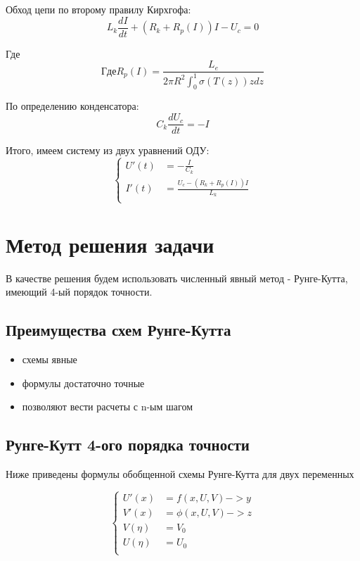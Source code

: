 \documentclass[a4paper,12pt]{article}
\begin{document}
Обход цепи по второму правилу Кирхгофа:
\[L_k \frac{dI}{dt} + (R_k + R_p(I)) I - U_c = 0\]

Где
\[Где R_p(I) = \frac{L_e}{2\pi R^2 \int_{0}^{1} \sigma(T(z)) zdz}\]



По определению конденсатора:
\[C_k \frac{dU_c}{dt} = -I\]

Итого, имеем систему из двух уравнений ОДУ:
\[
\left\{
\begin{aligned}
U'(t) &= -\frac{I}{C_k} \\
I'(t) &= \frac{U_c - (R_k + R_p(I)) I}{L_k} \\
\end{aligned}
\right.
\]

\section{Метод решения задачи}

В качестве решения будем использовать численный явный метод - Рунге-Кутта, имеющий 4-ый порядок точности.

\subsection{Преимущества схем Рунге-Кутта}
\begin{itemize}
	\item схемы явные
	\item формулы достаточно точные
	\item позволяют вести расчеты с n-ым шагом
\end{itemize}

\subsection{Рунге-Кутт 4-ого порядка точности}

Ниже приведены формулы обобщенной схемы Рунге-Кутта для двух переменных

\[
\left\{
\begin{aligned}
	U'(x) &= f(x, U, V) -> y \\
	V'(x) &= \phi(x, U, V) -> z \\
	V(\eta) &= V_0 \\
	U(\eta) &= U_0 \\
\end{aligned}
\right.
\]
\end{document}
